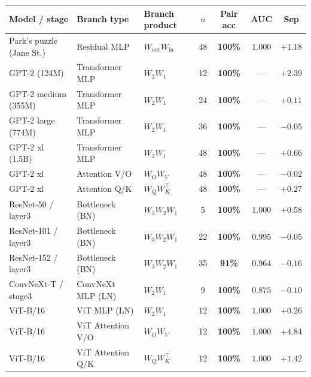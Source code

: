 \documentclass[10pt]{article}
\theoremstyle{remark}
\begin{document}
\begin{table}[H]
\centering
\small
\setlength{\tabcolsep}{4pt}
\renewcommand{\arraystretch}{1.15}
\begin{tabular}{lllcccc}
\toprule
Model / stage & Branch type & Branch product & $n$ & Pair acc & AUC & Sep \\
\midrule
Park's puzzle (Jane St.)   & Residual MLP        & $W_{\mathrm{out}} W_{\mathrm{in}}$ & 48 & \textbf{100\%} & $1.000$ & $+1.18$ \\
\midrule
GPT-2 (124M)               & Transformer MLP     & $W_2 W_1$                          & 12 & \textbf{100\%} & ---     & $+2.39$ \\
GPT-2 medium (355M)        & Transformer MLP     & $W_2 W_1$                          & 24 & \textbf{100\%} & ---     & $+0.11$ \\
GPT-2 large (774M)         & Transformer MLP     & $W_2 W_1$                          & 36 & \textbf{100\%} & ---     & $-0.05$ \\
GPT-2 xl (1.5B)            & Transformer MLP     & $W_2 W_1$                          & 48 & \textbf{100\%} & ---     & $+0.66$ \\
GPT-2 xl                   & Attention V/O       & $W_O W_V$                          & 48 & \textbf{100\%} & ---     & $-0.02$ \\
GPT-2 xl                   & Attention Q/K       & $W_Q W_K^\top$                     & 48 & \textbf{100\%} & ---     & $+0.27$ \\
\midrule
ResNet-50 / layer3         & Bottleneck (BN)     & $W_3 W_2 W_1$                      &  5 & \textbf{100\%} & $1.000$ & $+0.58$ \\
ResNet-101 / layer3        & Bottleneck (BN)     & $W_3 W_2 W_1$                      & 22 & \textbf{100\%} & $0.995$ & $-0.05$ \\
ResNet-152 / layer3        & Bottleneck (BN)     & $W_3 W_2 W_1$                      & 35 & \textbf{91\%}  & $0.964$ & $-0.16$ \\
\midrule
ConvNeXt-T / stage3        & ConvNeXt MLP (LN)   & $W_2 W_1$                          &  9 & \textbf{100\%} & $0.875$ & $-0.10$ \\
ViT-B/16                   & ViT MLP (LN)        & $W_2 W_1$                          & 12 & \textbf{100\%} & $1.000$ & $+0.26$ \\
ViT-B/16                   & ViT Attention V/O   & $W_O W_V$                          & 12 & \textbf{100\%} & $1.000$ & $+4.84$ \\
ViT-B/16                   & ViT Attention Q/K   & $W_Q W_K^\top$                     & 12 & \textbf{100\%} & $1.000$ & $+1.42$ \\

\end{tabular}
\end{table}
\end{document}
